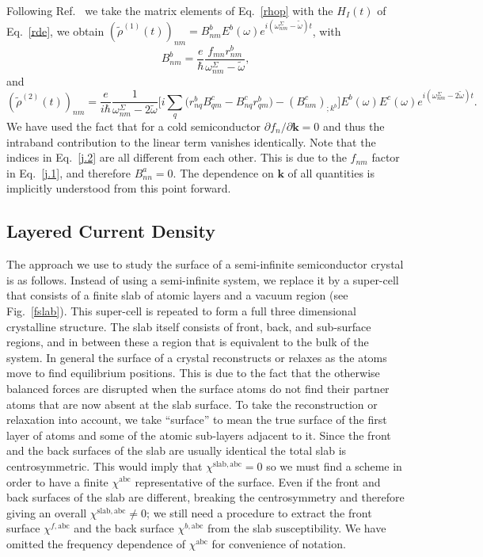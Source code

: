 \documentclass[floatfix,prb,aps,superscriptaddress,showpacs,11pt,preprint,letterpaper]{revtex4}
\begin{document}
Following Ref.~ we take the
matrix elements of Eq.~\eqref{rhop} with the $H_{I}(t)$ of 
Eq.~\eqref{rde}, we obtain 
$(\tilde{\rho}^{(1)}(t))_{nm}=B_{nm}^{b}E^{b}(\omega)e^{i(\omega^\Sigma_{nm}-\tilde\omega)t}$,
with 
\begin{equation}
B_{nm}^{b}=\frac{e}{\hbar }\frac{f_{mn}r_{nm}^{b}}{\omega^\Sigma_{nm}-\tilde\omega},
\label{j.1}
\end{equation}
and 
\begin{equation}
(\tilde{\rho}^{(2)}(t))_{nm} = \frac{e}{i\hbar }\frac{1}{\omega^\Sigma_{nm}-2\tilde\omega}\bigg[
i\sum_{q }\Big(r_{nq }^{b}B_{q m}^{c}-B_{nq}^{c}r_{q m}^{b}
\Big)  
-(B_{nm}^{c})_{;k^{b}}\bigg]E^{b}(\omega)E^{c}(\omega)e^{i(\omega^\Sigma_{nm}-2\tilde\omega)t}
.
\label{j.2}
\end{equation}
We have used the fact that for a cold semiconductor $\partial
f_{n}/\partial \mathbf{k}=0$ and thus the intraband contribution to the linear
term vanishes identically. 
Note that the indices in Eq.~\eqref{j.2} are all different from each
other. This is due to the $f_{nm}$ factor in Eq.~\eqref{j.1}, 
and therefore $B^a_{nn}=0$. The dependence on $\mathbf{k}$ 
of all quantities is implicitly understood from 
this point forward.

\subsection{Layered Current Density}\label{cd}

The approach we use to study the surface of a semi-infinite
semiconductor crystal is as follows. Instead of using a
semi-infinite system, we replace it by a super-cell that 
consists of a finite
slab of atomic layers and a vacuum region (see Fig.~\ref{fslab}). This
super-cell
is repeated to form a full three dimensional crystalline structure.
The slab itself consists of front, back, and 
sub-surface regions, and in between these
a region that is equivalent to the
bulk of the system. 
In general the surface of a crystal reconstructs or relaxes as the atoms
move to find equilibrium positions. This is due to the fact that
the otherwise
balanced forces are disrupted when the surface atoms do not find their 
partner atoms that are now absent at the slab surface.
To take the reconstruction or relaxation into account, 
we take ``surface'' to mean
the true surface of the first layer of atoms and
some of the atomic sub-layers adjacent to it.
Since the front and the back
surfaces of the slab are usually identical the total slab is
centrosymmetric. This would imply that 
$\chi^{\mathrm{slab},\mathrm{a}\mathrm{b}\mathrm{c}}=0$ so we must
find a scheme 
in order to have a finite $\chi^{\mathrm{a}\mathrm{b}\mathrm{c}}$ representative of the
surface. Even if the front and back surfaces of the slab 
are different, breaking the centrosymmetry and therefore giving an
overall $\chi^{\mathrm{slab},\mathrm{a}\mathrm{b}\mathrm{c}}\ne 0$; we still
need a procedure to extract the front surface $\chi^{f,\mathrm{a}\mathrm{b}\mathrm{c}}$
and the back surface $\chi^{b,\mathrm{a}\mathrm{b}\mathrm{c}}$ from the slab
susceptibility. 
We have omitted the frequency dependence of $\chi^{\mathrm{a}\mathrm{b}\mathrm{c}}$ for 
convenience of notation.
\end{document}
